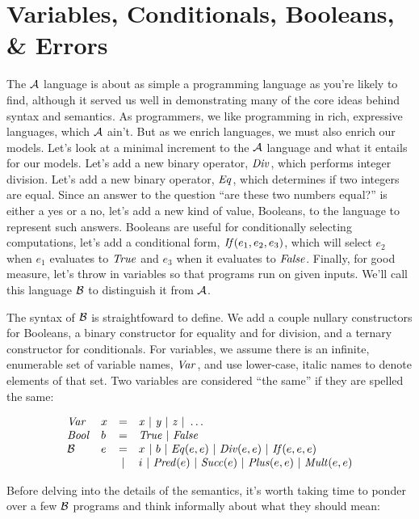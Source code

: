 \section{Variables, Conditionals, Booleans, \& Errors}

The $\mathcal{A}$ language is about as simple a programming language as
you're likely to find, although it served us well in demonstrating many
of the core ideas behind syntax and semantics.
%
As programmers, we like programming in rich, expressive languages, 
which $\mathcal{A}$ ain't.
%
But as we enrich languages, we must also enrich our models.
%
Let's look at a minimal increment to the $\mathcal{A}$ language and what it
entails for our models.
%
Let's add a new binary operator, $\mathit{Div}$, which performs integer
division.
%
Let's add a new binary operator, $\mathit{Eq}$, which determines if two
integers are equal.
%
Since an answer to the question ``are these two numbers equal?'' is
either a yes or a no, let's add a new kind of value, Booleans, to the
language to represent such answers.
%
Booleans are useful for conditionally selecting computations, let's
add a conditional form, $\mathit{If}(e_1,e_2,e_3)$, which will select $e_2$
when $e_1$ evaluates to $\mathit{True}$ and $e_3$ when it evaluates to
$\mathit{False}$.  Finally, for good measure, let's throw in variables so that
programs run on given inputs.  We'll call this language $\mathcal{B}$ to
distinguish it from $\mathcal{A}$.

The syntax of $\mathcal{B}$ is straightfoward to define.  We add a couple
nullary constructors for Booleans, a binary constructor for equality
and for division, and a ternary constructor for conditionals.  For
variables, we assume there is an infinite, enumerable set of variable
names, $\mathit{Var}$, and use lower-case, italic names to denote elements of
that set.  Two variables are considered ``the same'' if they are
spelled the same:

\[
\begin{array}{llcl}
\mathit{Var} & \mvar & = & \s{x}\ |\ \s{y}\ |\ \s{z}\ |\ \dots \\
\mathit{Bool} & \mbool & = & \True\ |\ \False\\
\Barith & e & = & \mvar\ |\ \mbool\ |\ \Eq(e,e)\ |\ \Div(e,e)\ |\ \If(e,e,e)\\
        &   & | & \mint\ |\ \Pred(e)\ |\ \Succ(e)\ |\ \Plus(e,e)\ |\ \Mult(e,e)
\end{array}
\]



Before delving into the details of the semantics, it's worth taking
time to ponder over a few $\mathcal{B}$ programs and think informally
about what they should mean:

